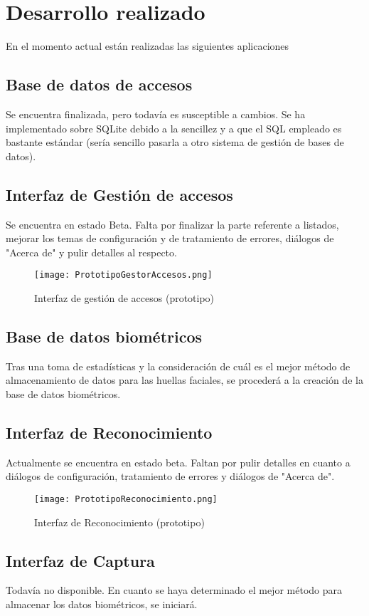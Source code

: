 \chapter{Desarrollo realizado}

En el momento actual están realizadas las siguientes aplicaciones

\section{Base de datos de accesos}
Se encuentra finalizada, pero todavía es susceptible a cambios. Se ha implementado sobre SQLite debido a la sencillez y a que el SQL empleado es bastante estándar (sería sencillo pasarla a otro sistema de gestión de bases de datos).

\section{Interfaz de Gestión de accesos}
Se encuentra en estado Beta. Falta por finalizar la parte referente a listados, mejorar los temas de configuración y de tratamiento de errores, diálogos de "Acerca de" y pulir detalles al respecto.

\begin{figure}[h!]
        \centering
        \texttt{[image: PrototipoGestorAccesos.png]}
        \caption{Interfaz de gestión de accesos (prototipo)}
	\label{fig:gestion_accesos}
\end{figure}


\section{Base de datos biométricos}
Tras una toma de estadísticas y la consideración de cuál es el mejor método de almacenamiento de datos para las huellas faciales, se procederá a la creación de la base de datos biométricos.

\section{Interfaz de Reconocimiento}
Actualmente se encuentra en estado beta. Faltan por pulir detalles en cuanto a diálogos de configuración, tratamiento de errores y diálogos de "Acerca de".

\begin{figure}[h!]
        \centering
        \texttt{[image: PrototipoReconocimiento.png]}
        \caption{Interfaz de Reconocimiento (prototipo)}
	\label{fig:reconocimiento}
\end{figure}

\section{Interfaz de Captura}
Todavía no disponible. En cuanto se haya determinado el mejor método para almacenar los datos biométricos, se iniciará.
